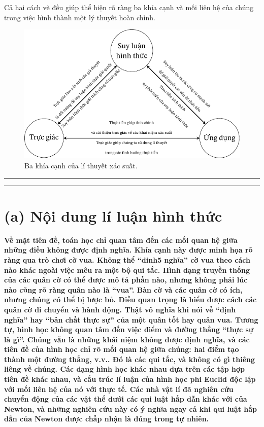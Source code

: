 Cả hai cách vẽ đều giúp thể hiện rõ ràng ba khía cạnh và mối liên hệ của chúng trong việc hình thành một lý thuyết hoàn chỉnh.

\begin{figure}[htbp]
    \centering
    \includegraphics*[scale=1]{ba_khia_canh_li_thuyet_xac_suat.pdf}
    \caption{Ba khía cạnh của lí thuyết xác suất.}
    \label{fig:ba_khia_canh_li_thuyet_xac_suat}
\end{figure}


\noindent\rule{\textwidth}{.4pt}

\noindent\rule{\textwidth}{.4pt}

\section*{(a) Nội dung lí luận hình thức}
{\bf Về mặt tiên đề, toán học chỉ quan tâm đến các mối quan hệ giữa những điều không được định nghĩa. Khía cạnh này được minh họa rõ ràng qua trò chơi cờ vua. Không thể ``dinh5 nghĩa'' cờ vua theo cách nào khác ngoài việc mêu ra một bộ qui tắc. Hình dạng truyền thống của các quân cờ có thể được mô tả phần nào, nhưng không phải lúc nào cũng rõ ràng quân nào là ``vua''. Bàn cờ và các quân cờ có ích, nhưng chúng có thể bị lược bỏ. Điều quan trọng là hiểu được cách các quân cờ di chuyển và hành động. Thật vô nghĩa khi nói về ``định nghĩa'' hay ``bản chất thực sự'' của một quân tốt hay quân vua. Tương tự, hình học không quan tâm đến việc điểm và đường thẳng ``thực sự là gì''. Chúng vẫn là những khái niệm không được định nghĩa, và các tiên đề của hình học chỉ rõ mối quan hệ giữa chúng: hai điểm tạo thành một đường thẳng, v.v.. Đó là các qui tắc, và không có gì thiêng liêng về chúng. Các dạng hình học khác nhau dựa trên các tập hợp tiên đề khác nhau, và cấu trúc lí luận của hình học phi Euclid độc lập với mối liên hệ của nó với thực tế. Các nhà vật lí đã nghiên cứu chuyển động của các vật thể dưới các qui luật hấp dẫn khác với của Newton, và những nghiên cứu này có ý nghĩa ngay cả khi qui luật hấp dẫn của Newton được chấp nhận là đúng trong tự nhiên.}

